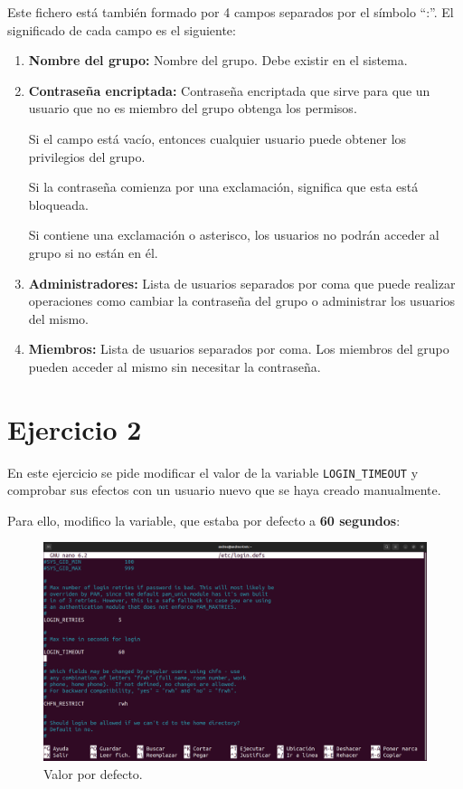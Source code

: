 \documentclass{article}
\begin{document}
Este fichero está también formado por 4 campos separados por el símbolo ``:''. El significado de cada campo es el siguiente:

\begin{enumerate}
    \item \textbf{Nombre del grupo: }Nombre del grupo. Debe existir en el sistema.
    \item \textbf{Contraseña encriptada: }Contraseña encriptada que sirve para que un usuario que no es miembro del grupo obtenga los permisos.
    
    Si el campo está vacío, entonces cualquier usuario puede obtener los privilegios del grupo.

    Si la contraseña comienza por una exclamación, significa que esta está bloqueada.

    Si contiene una exclamación o asterisco, los usuarios no podrán acceder al grupo si no están en él.

    \item \textbf{Administradores: }Lista de usuarios separados por coma que puede realizar operaciones como cambiar la contraseña del grupo o administrar los usuarios del mismo.
    \item \textbf{Miembros: }Lista de usuarios separados por coma. Los miembros del grupo pueden acceder al mismo sin necesitar la contraseña.
\end{enumerate}

\section*{Ejercicio 2}
En este ejercicio se pide modificar el valor de la variable \verb|LOGIN_TIMEOUT| y comprobar sus efectos con un usuario nuevo que se haya creado manualmente.

\bigskip

Para ello, modifico la variable, que estaba por defecto a \textbf{60 segundos}:

\begin{figure}[H]
    \includegraphics[width=\textwidth]{imagenes/tout60.png}
    \caption{Valor por defecto.}
\end{figure}
\end{document}
